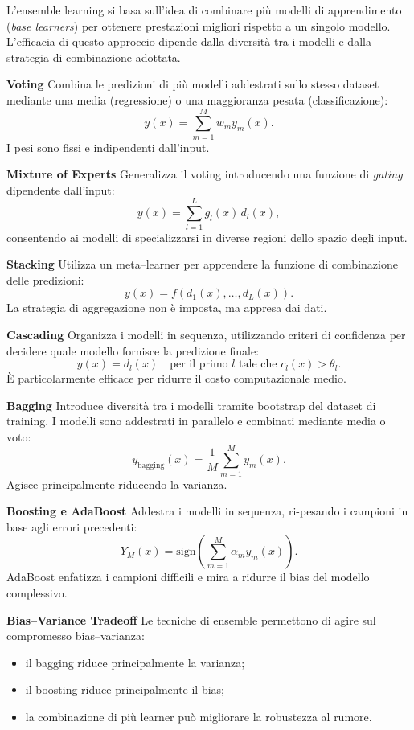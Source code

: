 \documentclass[a4paper,12pt]{report}
\begin{document}
\begin{tcolorbox}[
    colback=green!10,
    colframe=green!50!black,
    title=\textbf{Multiple Learners -- Concetti chiave},
    fonttitle=\bfseries,
    sharp corners,
    boxrule=0.8pt,
    breakable
]

L’ensemble learning si basa sull’idea di combinare più modelli di apprendimento (\emph{base learners}) per ottenere prestazioni migliori rispetto a un singolo modello. L’efficacia di questo approccio dipende dalla diversità tra i modelli e dalla strategia di combinazione adottata.

\medskip
\textbf{Voting}  
Combina le predizioni di più modelli addestrati sullo stesso dataset mediante una media (regressione) o una maggioranza pesata (classificazione):
\[
y(x) = \sum_{m=1}^{M} w_m y_m(x).
\]
I pesi sono fissi e indipendenti dall’input.

\medskip
\textbf{Mixture of Experts}  
Generalizza il voting introducendo una funzione di \emph{gating} dipendente dall’input:
\[
y(x) = \sum_{l=1}^{L} g_l(x)\, d_l(x),
\]
consentendo ai modelli di specializzarsi in diverse regioni dello spazio degli input.

\medskip
\textbf{Stacking}  
Utilizza un meta–learner per apprendere la funzione di combinazione delle predizioni:
\[
y(x) = f(d_1(x), \dots, d_L(x)).
\]
La strategia di aggregazione non è imposta, ma appresa dai dati.

\medskip
\textbf{Cascading}  
Organizza i modelli in sequenza, utilizzando criteri di confidenza per decidere quale modello fornisce la predizione finale:
\[
y(x) = d_l(x) \quad \text{per il primo } l \text{ tale che } c_l(x) > \theta_l.
\]
È particolarmente efficace per ridurre il costo computazionale medio.

\medskip
\textbf{Bagging}  
Introduce diversità tra i modelli tramite bootstrap del dataset di training. I modelli sono addestrati in parallelo e combinati mediante media o voto:
\[
y_{\text{bagging}}(x) = \frac{1}{M} \sum_{m=1}^{M} y_m(x).
\]
Agisce principalmente riducendo la varianza.

\medskip
\textbf{Boosting e AdaBoost}  
Addestra i modelli in sequenza, ri-pesando i campioni in base agli errori precedenti:
\[
Y_M(x) = \mathrm{sign}\!\left(\sum_{m=1}^{M} \alpha_m y_m(x)\right).
\]
AdaBoost enfatizza i campioni difficili e mira a ridurre il bias del modello complessivo.

\medskip
\textbf{Bias--Variance Tradeoff}  
Le tecniche di ensemble permettono di agire sul compromesso bias–varianza:
\begin{itemize}
    \item il bagging riduce principalmente la varianza;
    \item il boosting riduce principalmente il bias;
    \item la combinazione di più learner può migliorare la robustezza al rumore.
\end{itemize}


\end{tcolorbox}
\end{document}
